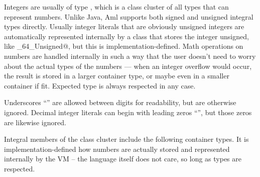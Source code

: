 Integers are usually of type \lstinline@Number@, which is a class cluster of all types that can represent numbers. Unlike Java, Aml supports both signed and unsigned integral types directly. Usually integer literals that are obviously unsigned integers are automatically represented internally by a class that stores the integer unsigned, like \lstinline@Integer_64_Unsigned@, but this is implementation-defined. Math operations on numbers are handled internally in such a way that the user doesn't need to worry about the actual types of the numbers — when an integer overflow would occur, the result is stored in a larger container type, or maybe even in a smaller container if fit. Expected type is always respected in any case. 

Underscores ``\code{_}'' are allowed between digits for readability, but are otherwise ignored. Decimal integer literals can begin with leading zeros ``'', but those zeros are likewise ignored. 

Integral members of the \lstinline@Number@ class cluster include the following container types. It is implementation-defined how numbers are actually stored and represented internally by the VM -- the language itself does not care, so long as types are respected. 

